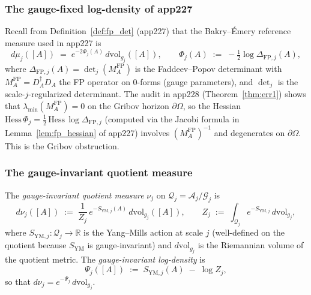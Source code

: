 \subsubsection{The gauge-fixed log-density of app227}

Recall from Definition~\ref{def:fp_det} (app227) that the
Bakry--\'Emery reference measure used in app227 is
\begin{equation}
\label{eq:app227_measure_recap}
  d\mu_{j}([A])
  \;=\;e^{-2\Phi_{j}(A)}\,d\mathrm{vol}_{g_{j}}([A]),
  \qquad
  \Phi_{j}(A)\;:=\;-\tfrac{1}{2}\log\Delta_{\mathrm{FP},j}(A),
\end{equation}
where $\Delta_{\mathrm{FP},j}(A)=\det_{j}(M_{A}^{\mathrm{FP}})$
is the Faddeev--Popov determinant with
$M_{A}^{\mathrm{FP}}=D_{A}^{\dagger}D_{A}$ the FP operator on
$0$-forms (gauge parameters), and $\det_{j}$ is the
scale-$j$-regularized determinant. The audit in app228
(Theorem~\ref{thm:err1}) shows that
$\lambda_{\min}(M_{A}^{\mathrm{FP}})=0$ on the Gribov horizon
$\partial\Omega$, so the Hessian
$\mathrm{Hess}\,\Phi_{j}=\tfrac{1}{2}\,\mathrm{Hess}\,
\log\Delta_{\mathrm{FP},j}$ (computed via the Jacobi formula in
Lemma~\ref{lem:fp_hessian} of app227) involves
$(M_{A}^{\mathrm{FP}})^{-1}$ and degenerates on $\partial\Omega$.
This is the Gribov obstruction.

\subsubsection{The gauge-invariant quotient measure}

\begin{definition}
\label{def:gauge_invariant_measure}
The \emph{gauge-invariant quotient measure} $\nu_{j}$ on
$\mathcal{Q}_{j}=\mathcal{A}_{j}/\mathcal{G}_{j}$ is
\begin{equation}
\label{eq:gauge_invariant_measure}
  d\nu_{j}([A])
  \;:=\;\frac{1}{Z_{j}}\,
  e^{-S_{\mathrm{YM},j}(A)}\,
  d\mathrm{vol}_{g_{j}}([A]),
  \qquad
  Z_{j}\;:=\;\int_{\mathcal{Q}_{j}}e^{-S_{\mathrm{YM},j}}\,
  d\mathrm{vol}_{g_{j}},
\end{equation}
where $S_{\mathrm{YM},j}:\mathcal{Q}_{j}\to\mathbb{R}$ is the
Yang--Mills action at scale $j$ (well-defined on the quotient
because $S_{\mathrm{YM}}$ is gauge-invariant) and
$d\mathrm{vol}_{g_{j}}$ is the Riemannian volume of the quotient
metric. The \emph{gauge-invariant log-density} is
\begin{equation}
\label{eq:ym_logdensity}
  \Psi_{j}([A])\;:=\;S_{\mathrm{YM},j}(A)\;-\;\log Z_{j},
\end{equation}
so that $d\nu_{j}=e^{-\Psi_{j}}\,d\mathrm{vol}_{g_{j}}$.
\end{definition}

